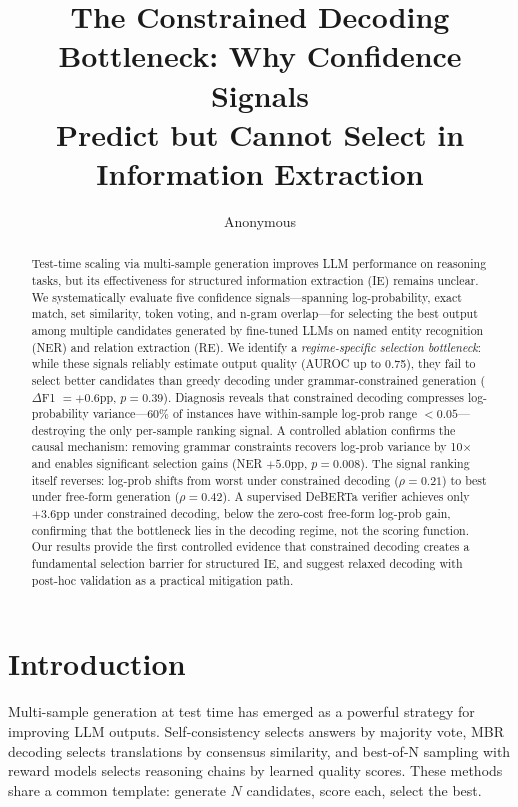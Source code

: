 \documentclass[11pt,a4paper]{article}
\title{The Constrained Decoding Bottleneck: Why Confidence Signals\\Predict but Cannot Select in Information Extraction}
\author{Anonymous}
\date{}
\begin{document}
\maketitle

\begin{abstract}
Test-time scaling via multi-sample generation improves LLM performance on reasoning tasks, but its effectiveness for structured information extraction (IE) remains unclear. We systematically evaluate five confidence signals---spanning log-probability, exact match, set similarity, token voting, and n-gram overlap---for selecting the best output among multiple candidates generated by fine-tuned LLMs on named entity recognition (NER) and relation extraction (RE). We identify a \emph{regime-specific selection bottleneck}: while these signals reliably estimate output quality (AUROC up to 0.75), they fail to select better candidates than greedy decoding under grammar-constrained generation ($\Delta$F1 $= +0.6$pp, $p = 0.39$). Diagnosis reveals that constrained decoding compresses log-probability variance---60\% of instances have within-sample log-prob range $< 0.05$---destroying the only per-sample ranking signal. A controlled ablation confirms the causal mechanism: removing grammar constraints recovers log-prob variance by 10$\times$ and enables significant selection gains (NER $+5.0$pp, $p = 0.008$). The signal ranking itself reverses: log-prob shifts from worst under constrained decoding ($\rho = 0.21$) to best under free-form generation ($\rho = 0.42$). A supervised DeBERTa verifier achieves only $+3.6$pp under constrained decoding, below the zero-cost free-form log-prob gain, confirming that the bottleneck lies in the decoding regime, not the scoring function. Our results provide the first controlled evidence that constrained decoding creates a fundamental selection barrier for structured IE, and suggest relaxed decoding with post-hoc validation as a practical mitigation path.
\end{abstract}

\section{Introduction}
\label{sec:intro}

Multi-sample generation at test time has emerged as a powerful strategy for improving LLM outputs. Self-consistency \citep{wang2023selfconsistency} selects answers by majority vote, MBR decoding \citep{eikema2022sampling} selects translations by consensus similarity, and best-of-N sampling with reward models \citep{cobbe2021training,lightman2023lets} selects reasoning chains by learned quality scores. These methods share a common template: generate $N$ candidates, score each, select the best.
\end{document}
